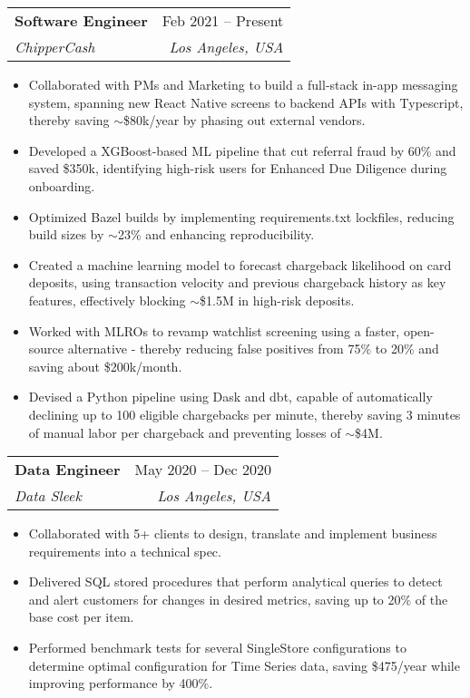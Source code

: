 \documentclass[letterpaper,11pt]{article}
\makeatletter
\newcommand{\resumeItem}[1]{
  \item\small{
    {#1 \vspace{-2pt}}
  }
}
\newcommand{\resumeSubheading}[4]{
  \vspace{-2pt}\item
    \begin{tabular*}{0.97\textwidth}[t]{l@{\extracolsep{\fill}}r}
      \textbf{#1} & #2 \\
      \textit{\small#3} & \textit{\small #4} \\
    \end{tabular*}\vspace{-7pt}
}
\newcommand{\resumeSubSubheading}[2]{
    \item
    \begin{tabular*}{0.97\textwidth}{l@{\extracolsep{\fill}}r}
      \textit{\small#1} & \textit{\small #2} \\
    \end{tabular*}\vspace{-7pt}
}
\newcommand{\resumeSubHeadingListEnd}{\end{itemize}}
\newcommand{\resumeItemListStart}{\begin{itemize}}
\newcommand{\resumeItemListEnd}{\end{itemize}\vspace{-5pt}}
\makeatother
\begin{document}
    \resumeSubheading
      {Software Engineer}{Feb 2021 -- Present}
      {ChipperCash}{Los Angeles, USA}
      \resumeItemListStart
        \resumeItem{Collaborated with PMs and Marketing to build a full-stack in-app messaging system, spanning new React Native screens
to backend APIs with Typescript, thereby saving $\sim$\$80k/year by phasing out external vendors.}
        \resumeItem{Developed a XGBoost-based ML pipeline that cut referral fraud by 60\% and saved \$350k, identifying high-risk users for Enhanced Due Diligence during onboarding.}
        \resumeItem{Optimized Bazel builds by implementing requirements.txt lockfiles, reducing build sizes by $\sim$23\% and enhancing reproducibility.}
        \resumeItem{Created a machine learning model to forecast chargeback likelihood on card deposits, using transaction velocity and previous chargeback history as key features, effectively blocking $\sim$\$1.5M in high-risk deposits.}
        \resumeItem{Worked with MLROs to revamp watchlist screening using a faster, open-source alternative - thereby reducing false positives from 75\% to 20\% and saving about \$200k/month.}
        \resumeItem{Devised a Python pipeline using Dask and dbt, capable of automatically declining up to 100 eligible chargebacks per minute, thereby saving 3 minutes of manual labor per chargeback and preventing losses of $\sim$\$4M.}
      \resumeItemListEnd
      

    \resumeSubheading
      {Data Engineer}{May 2020 -- Dec 2020}
      {Data Sleek}{Los Angeles, USA}
      \resumeItemListStart
        \resumeItem{Collaborated with 5+ clients to design, translate and implement business requirements into a technical spec.}
        \resumeItem{Delivered SQL stored procedures that perform analytical queries to detect and alert customers for changes in desired
metrics, saving up to 20\% of the base cost per item.}
        \resumeItem{Performed benchmark tests for several SingleStore configurations to determine optimal configuration for Time Series data, saving \$475/year while improving performance by 400\%.}
    \resumeItemListEnd
\end{document}
